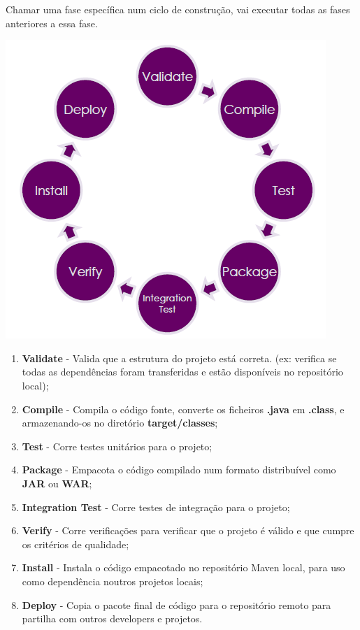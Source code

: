 \documentclass{article}
\begin{document}
Chamar uma fase específica num ciclo de construção, vai executar
todas as fases anteriores a essa fase.

\pagebreak

\begin{center}
  \includegraphics[scale=0.5]{2}
\end{center}

\begin{flushleft}
  \begin{enumerate}
    \item \textbf{Validate} - Valida que a estrutura do projeto está correta.
    (ex: verifica se todas as dependências foram transferidas e estão disponíveis
    no repositório local);

    \item \textbf{Compile} - Compila o código fonte, converte os ficheiros
    \textbf{.java} em \textbf{.class}, e armazenando-os no diretório \textbf{target/classes};

    \item \textbf{Test} - Corre testes unitários para o projeto;
    \item \textbf{Package} - Empacota o código compilado num formato distribuível
    como \textbf{JAR} ou \textbf{WAR};

    \item \textbf{Integration Test} - Corre testes de integração para o projeto;
    \item \textbf{Verify} - Corre verificações para verificar que o projeto é válido
    e que cumpre os critérios de qualidade;

    \item \textbf{Install} - Instala o código empacotado
    no repositório Maven local, para uso como dependência noutros projetos locais;

    \item \textbf{Deploy} - Copia o pacote final de código para o repositório
    remoto para partilha com outros developers e projetos.
  \end{enumerate}
\end{flushleft}
\end{document}
